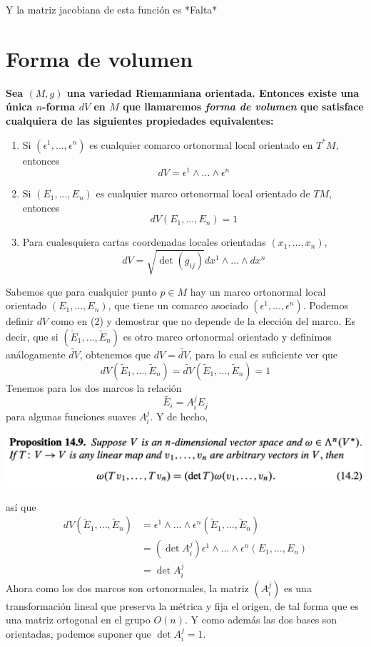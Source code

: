 \documentclass[11pt]{article}
\theoremstyle{definition}
\begin{document}
Y la matriz jacobiana de esta función es *Falta*

\newpage
\section*{Forma de volumen}
\textbf{Sea $(M,g)$ una variedad Riemanniana orientada. Entonces existe una única $n$-forma $dV$ en $M$ que llamaremos \textit{forma de volumen} que satisface cualquiera de las siguientes propiedades equivalentes:}
\begin{enumerate}[label={(\arabic*)}]
    \item Si $(\epsilon^1,...,\epsilon^n)$ es cualquier comarco ortonormal local orientado en $T^*M$, entonces
    $$dV=\epsilon^1\wedge...\wedge\epsilon^n$$
    \item Si $(E_1,...,E_n)$ es cualquier marco ortonormal local orientado de $TM$, entonces
    $$dV(E_1,...,E_n)=1$$
    \item Para cualesquiera cartas coordenadas locales orientadas $(x_1,...,x_n)$,
    $$dV=\sqrt{\det (g_{ij})}dx^1\wedge...\wedge dx^n$$
\end{enumerate}
Sabemos que para cualquier punto $p\in M$ hay un marco ortonormal local orientado $(E_1,...,E_n)$, que tiene un comarco asociado $(\epsilon^1,...,\epsilon^n)$. Podemos definir $dV$ como en (2) y demostrar que no depende de la elección del marco. Es decir, que si $(\widetilde{E}_1,...,\widetilde{E}_n)$ es otro marco ortonormal orientado y definimos análogamente $\widetilde{dV}$, obtenemos que $dV=\widetilde{dV}$, para lo cual es suficiente ver que 
$$dV(\widetilde{E}_1,...,\widetilde{E}_n)=\widetilde{dV}(\widetilde{E}_1,...,\widetilde{E}_n)=1$$
Tenemos para los dos marcos la relación
$$\widetilde{E_i}=A^j_iE_j$$
para algunas funciones suaves $A^j_i$. Y de hecho,\par
\hfill\break
\centerline{\includegraphics[scale=0.5]{prop14.9.png}}
así que
\begin{align*}
dV(\widetilde{E}_1,...,\widetilde{E}_n)&=\epsilon^1\wedge...\wedge\epsilon^n(\widetilde{E}_1,...,\widetilde{E}_n)\\
&=(\det{A^j_i})\epsilon^1\wedge...\wedge\epsilon^n(E_1,...,E_n)\\
&=\det{A^j_i}
\end{align*}
Ahora como los dos marcos son ortonormales, la matriz $(A^j_i)$ es una transformación lineal que preserva la métrica y fija el origen, de tal forma que es una matriz ortogonal en el grupo $O(n)$. Y como además las dos bases son orientadas, podemos suponer que $\det{A^j_i}=1$.\par
\end{document}
